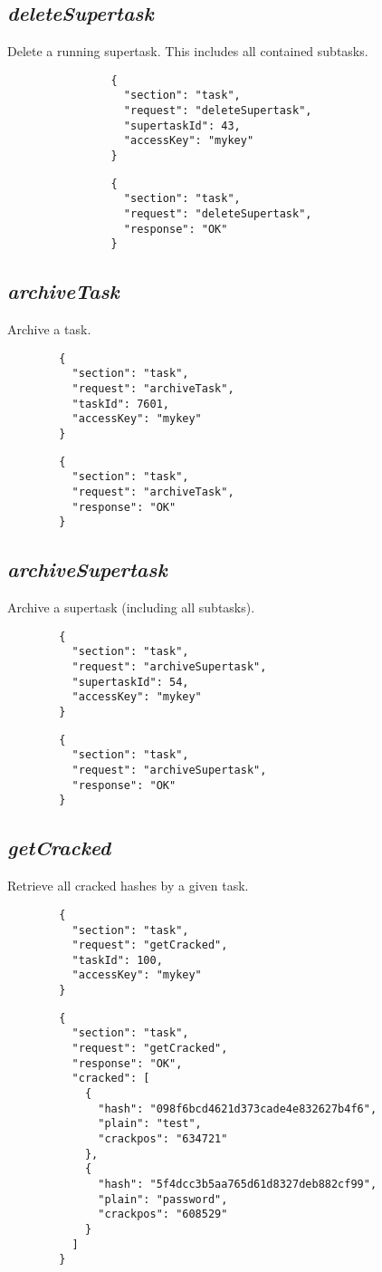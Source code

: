 		\subsection*{\textit{deleteSupertask}}
			Delete a running supertask. This includes all contained subtasks.
			{
				\color{blue}
				\begin{verbatim}
				{
				  "section": "task",
				  "request": "deleteSupertask",
				  "supertaskId": 43,
				  "accessKey": "mykey"
				}
				\end{verbatim}
			}
			{
				\color{OliveGreen}
				\begin{verbatim}
				{
				  "section": "task",
				  "request": "deleteSupertask",
				  "response": "OK"
				}
				\end{verbatim}
			}
\subsection*{\textit{archiveTask}}
	Archive a task.
	{
		\color{blue}
		\begin{verbatim}
		{
		  "section": "task",
		  "request": "archiveTask",
		  "taskId": 7601,
		  "accessKey": "mykey"
		}
		\end{verbatim}
	}
	{
		\color{OliveGreen}
		\begin{verbatim}
		{
		  "section": "task",
		  "request": "archiveTask",
		  "response": "OK"
		}
		\end{verbatim}
	}
\subsection*{\textit{archiveSupertask}}
	Archive a supertask (including all subtasks).
	{
		\color{blue}
		\begin{verbatim}
		{
		  "section": "task",
		  "request": "archiveSupertask",
		  "supertaskId": 54,
		  "accessKey": "mykey"
		}
		\end{verbatim}
	}
	{
		\color{OliveGreen}
		\begin{verbatim}
		{
		  "section": "task",
		  "request": "archiveSupertask",
		  "response": "OK"
		}
		\end{verbatim}
	}

\subsection*{\textit{getCracked}}
	Retrieve all cracked hashes by a given task.
	{
		\color{blue}
		\begin{verbatim}
		{
		  "section": "task",
		  "request": "getCracked",
		  "taskId": 100,
		  "accessKey": "mykey"
		}
		\end{verbatim}
	}
	{
		\color{OliveGreen}
		\begin{verbatim}
		{
		  "section": "task",
		  "request": "getCracked",
		  "response": "OK",
		  "cracked": [
		    {
		      "hash": "098f6bcd4621d373cade4e832627b4f6",
		      "plain": "test",
		      "crackpos": "634721"
		    },
		    {
		      "hash": "5f4dcc3b5aa765d61d8327deb882cf99",
		      "plain": "password",
		      "crackpos": "608529"
		    }
		  ]
		}
		\end{verbatim}
	}

